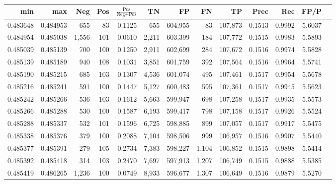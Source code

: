 \begin{tabular}{rrrrrrrrrrrrr}
\toprule
     min &      max &   Neg & Pos & $\frac{\text{Pos}}{\text{Neg}+\text{Pos}}$ &      TN &      FP &      FN &      TP &   Prec &    Rec &   FP/P \\
\midrule
0.483648 & 0.484953 &   655 &  83 &                                     0.1125 &     655 & 604,955 &      83 & 107,873 & 0.1513 & 0.9992 & 5.6037 \\
0.484954 & 0.485038 & 1,556 & 101 &                                     0.0610 &   2,211 & 603,399 &     184 & 107,772 & 0.1515 & 0.9983 & 5.5893 \\
0.485039 & 0.485139 &   700 & 100 &                                     0.1250 &   2,911 & 602,699 &     284 & 107,672 & 0.1516 & 0.9974 & 5.5828 \\
0.485139 & 0.485189 &   940 & 108 &                                     0.1031 &   3,851 & 601,759 &     392 & 107,564 & 0.1516 & 0.9964 & 5.5741 \\
0.485190 & 0.485215 &   685 & 103 &                                     0.1307 &   4,536 & 601,074 &     495 & 107,461 & 0.1517 & 0.9954 & 5.5678 \\
0.485216 & 0.485241 &   591 & 100 &                                     0.1447 &   5,127 & 600,483 &     595 & 107,361 & 0.1517 & 0.9945 & 5.5623 \\
0.485242 & 0.485266 &   536 & 103 &                                     0.1612 &   5,663 & 599,947 &     698 & 107,258 & 0.1517 & 0.9935 & 5.5573 \\
0.485266 & 0.485288 &   530 & 100 &                                     0.1587 &   6,193 & 599,417 &     798 & 107,158 & 0.1517 & 0.9926 & 5.5524 \\
0.485288 & 0.485337 &   532 & 101 &                                     0.1596 &   6,725 & 598,885 &     899 & 107,057 & 0.1517 & 0.9917 & 5.5475 \\
0.485338 & 0.485376 &   379 & 100 &                                     0.2088 &   7,104 & 598,506 &     999 & 106,957 & 0.1516 & 0.9907 & 5.5440 \\
0.485377 & 0.485391 &   279 & 105 &                                     0.2734 &   7,383 & 598,227 &   1,104 & 106,852 & 0.1515 & 0.9898 & 5.5414 \\
0.485392 & 0.485418 &   314 & 103 &                                     0.2470 &   7,697 & 597,913 &   1,207 & 106,749 & 0.1515 & 0.9888 & 5.5385 \\
0.485419 & 0.486265 & 1,236 & 100 &                                     0.0749 &   8,933 & 596,677 &   1,307 & 106,649 & 0.1516 & 0.9879 & 5.5270 \\

\end{tabular}
